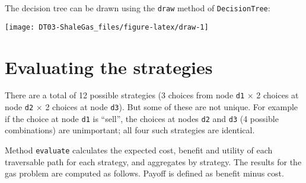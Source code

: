 \documentclass[
]{article}
\newenvironment{Shaded}{\begin{snugshade}}{\end{snugshade}}
\newcommand{\AttributeTok}[1]{\textcolor[rgb]{0.77,0.63,0.00}{#1}}
\newcommand{\CommentTok}[1]{\textcolor[rgb]{0.56,0.35,0.01}{\textit{#1}}}
\newcommand{\DecValTok}[1]{\textcolor[rgb]{0.00,0.00,0.81}{#1}}
\newcommand{\FunctionTok}[1]{\textcolor[rgb]{0.00,0.00,0.00}{#1}}
\newcommand{\NormalTok}[1]{#1}
\newcommand{\OtherTok}[1]{\textcolor[rgb]{0.56,0.35,0.01}{#1}}
\newcommand{\SpecialCharTok}[1]{\textcolor[rgb]{0.00,0.00,0.00}{#1}}
\newcommand{\StringTok}[1]{\textcolor[rgb]{0.31,0.60,0.02}{#1}}
\begin{document}
\begin{Shaded}
\end{Shaded}

The decision tree can be drawn using the \texttt{draw} method of
\texttt{DecisionTree}:

\begin{center}\texttt{[image: DT03-ShaleGas\_files/figure-latex/draw-1]} \end{center}

\hypertarget{evaluating-the-strategies}{%
\section{Evaluating the strategies}\label{evaluating-the-strategies}}

There are a total of 12 possible strategies (3 choices from node
\texttt{d1} \(\times\) 2 choices at node \texttt{d2} \(\times\) 2
choices at node \texttt{d3}). But some of these are not unique. For
example if the choice at node \texttt{d1} is ``sell'', the choices at
nodes \texttt{d2} and \texttt{d3} (4 possible combinations) are
unimportant; all four such strategies are identical.

Method \texttt{evaluate} calculates the expected cost, benefit and
utility of each traversable path for each strategy, and aggregates by
strategy. The results for the gas problem are computed as follows.
Payoff is defined as benefit minus cost.
\end{document}

